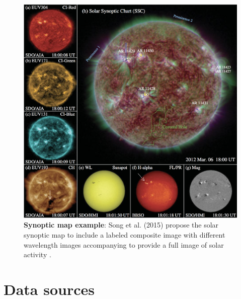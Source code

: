 \documentclass[twoside]{report}
\begin{document}
\begin{figure}[ht]
  \begin{center}
    \includegraphics[scale=0.25]{ssc_example-song-2015.png}
    \caption{{\bf Synoptic map example}: Song et al. (2015) propose the solar synoptic map to include a labeled composite image with different wavelength images accompanying to provide a full image of solar activity \cite{song:2015}. }
    \label{fig:sccexample}
 \end{center}
\end{figure}

\section{Data sources}
\end{document}
